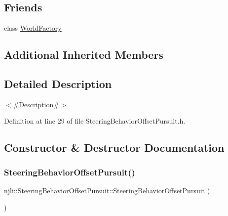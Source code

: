 \subsection*{Friends}
\begin{DoxyCompactItemize}
\item 
class \mbox{\hyperlink{classnjli_1_1_steering_behavior_offset_pursuit_acb96ebb09abe8f2a37a915a842babfac}{World\+Factory}}
\end{DoxyCompactItemize}
\subsection*{Additional Inherited Members}


\subsection{Detailed Description}
$<$\#\+Description\#$>$ 

Definition at line 29 of file Steering\+Behavior\+Offset\+Pursuit.\+h.



\subsection{Constructor \& Destructor Documentation}
\mbox{\label{classnjli_1_1_steering_behavior_offset_pursuit_a924f95fb19b7a44bd5f0a566d9daef2f}} 
\subsubsection{\texorpdfstring{Steering\+Behavior\+Offset\+Pursuit()}{SteeringBehaviorOffsetPursuit()}\hspace{0.1cm}{\footnotesize\ttfamily [1/3]}}
{\footnotesize\ttfamily njli\+::\+Steering\+Behavior\+Offset\+Pursuit\+::\+Steering\+Behavior\+Offset\+Pursuit (\begin{DoxyParamCaption}{ }\end{DoxyParamCaption})\hspace{0.3cm}{\ttfamily [protected]}}

